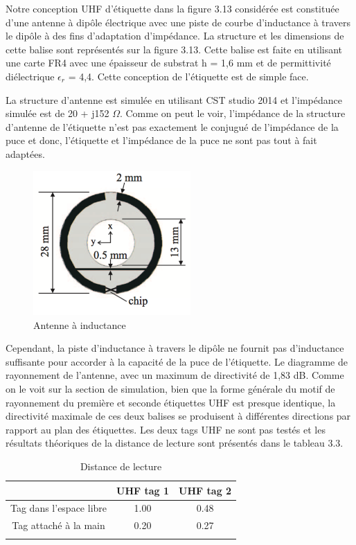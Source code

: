 \documentclass[11pt, a4paper, twoside]{book}
\begin{document}
Notre conception UHF d'étiquette dans la figure 3.13 considérée est constituée d'une antenne à dipôle électrique avec une piste de courbe d'inductance à travers le dipôle à des fins d'adaptation d'impédance. La structure et les dimensions de cette balise sont représentés sur la figure 3.13. Cette balise est faite en utilisant une carte FR4 avec une épaisseur de substrat h = 1,6 mm et de permittivité diélectrique \(\epsilon_{r}\) = 4,4. Cette conception de l'étiquette est de simple face.

 La structure d'antenne est simulée en utilisant CST studio 2014 et l'impédance simulée est de 20 + j152 \(\Omega\). Comme on peut le voir, l'impédance de la structure d'antenne de l'étiquette n'est pas exactement le conjugué de l'impédance de la puce \cite{alien} et donc, l'étiquette et l'impédance de la puce ne sont pas tout à fait adaptées.
\begin{figure}[H]
\centering
\includegraphics[width=6cm]{dofi}
\caption{Antenne à inductance}
\end{figure}

Cependant, la piste d'inductance à travers le dipôle ne fournit pas d'inductance suffisante pour accorder à la capacité de la puce de l'étiquette. Le diagramme de rayonnement de l'antenne, avec un maximum de directivité de 1,83 dB. Comme on le voit sur la section de simulation, bien que la forme générale du motif de rayonnement du première et seconde étiquettes UHF est presque identique, la directivité maximale de ces deux balises se produisent à différentes directions par rapport au plan des étiquettes. Les deux tags UHF ne sont pas testés et les résultats théoriques de la distance de lecture sont présentés dans le tableau 3.3.\\

\begin{longtable}[c]{| c | c | c |}
 \hline
  & UHF tag 1 & UHF tag 2 \\
 \hline
 Tag dans l'espace libre & 1.00 & 0.48\\
 \hline
 Tag attaché à la main  & 0.20 & 0.27\\
 \hline
\caption{Distance de lecture}
\end{longtable}
\end{document}
